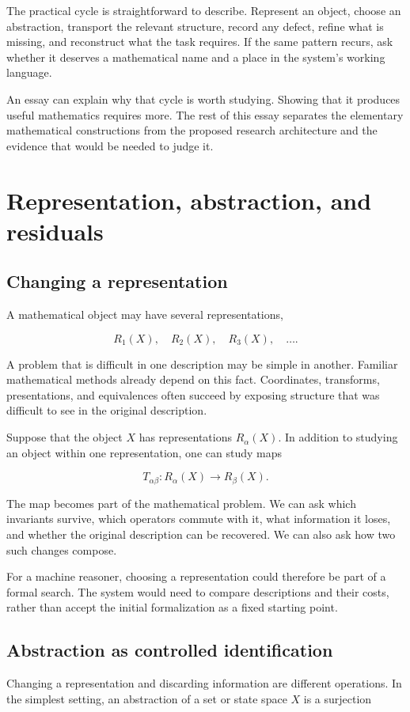 \documentclass[11pt,oneside,openany]{book}
\begin{document}
The practical cycle is straightforward to describe. Represent an object, choose an abstraction, transport the relevant structure, record any defect, refine what is missing, and reconstruct what the task requires. If the same pattern recurs, ask whether it deserves a mathematical name and a place in the system's working language.

An essay can explain why that cycle is worth studying. Showing that it produces useful mathematics requires more. The rest of this essay separates the elementary mathematical constructions from the proposed research architecture and the evidence that would be needed to judge it.

\chapter{Representation, abstraction, and residuals}
\section{Changing a representation}
A mathematical object may have several representations,

\[
R_1(X),\quad R_2(X),\quad R_3(X),\quad \ldots.
\]

A problem that is difficult in one description may be simple in another. Familiar mathematical methods already depend on this fact. Coordinates, transforms, presentations, and equivalences often succeed by exposing structure that was difficult to see in the original description.

Suppose that the object \(X\) has representations \(R_\alpha(X)\). In addition to studying an object within one representation, one can study maps

\[
T_{\alpha\beta}:R_\alpha(X)\longrightarrow R_\beta(X).
\]

The map becomes part of the mathematical problem. We can ask which invariants survive, which operators commute with it, what information it loses, and whether the original description can be recovered. We can also ask how two such changes compose.

For a machine reasoner, choosing a representation could therefore be part of a formal search. The system would need to compare descriptions and their costs, rather than accept the initial formalization as a fixed starting point.

\section{Abstraction as controlled identification}
Changing a representation and discarding information are different operations. In the simplest setting, an abstraction of a set or state space \(X\) is a surjection
\end{document}
